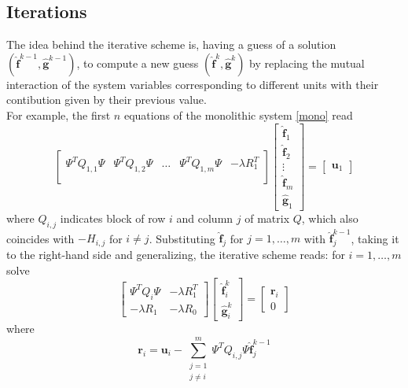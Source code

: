 \subsection{Iterations}
The idea behind the iterative scheme is, having a guess of a solution $(\hat{\mathbf{f}}^{k-1},\hat{\mathbf{g}}^{k-1})$, to compute a new guess $(\hat{\mathbf{f}}^k,\hat{\mathbf{g}}^k)$ by replacing the mutual interaction of the system variables corresponding to different units with their contibution given by their previous value.\\
For example, the first $n$ equations of the monolithic system \ref{mono} read
\begin{equation}
    \begin{bmatrix}
        \Psi^TQ_{1,1}\Psi & \Psi^TQ_{1,2}\Psi &\dots &\Psi^TQ_{1,m}\Psi & -\lambda R_1^T\\
    \end{bmatrix}
    \begin{bmatrix}
        \hat{\mathbf{f}}_1\\
        \hat{\mathbf{f}}_2\\
        \vdots\\
        \hat{\mathbf{f}}_m\\
        \hat{\mathbf{g}}_1    
    \end{bmatrix}
    =
    \begin{bmatrix}
        \mathbf{u}_1
    \end{bmatrix}
\end{equation}
where $Q_{i,j}$ indicates block of row $i$ and column $j$ of matrix $Q$, which also coincides with $-H_{i,j}$ for $i \neq j$.
Substituting $\hat{\mathbf{f}}_j$ for $j=1,\dots,m$ with $\hat{\mathbf{f}}_j^{k-1}$, taking it to the right-hand side and generalizing, the iterative scheme reads: for $i = 1, \dots, m$ solve
\begin{equation}
    \begin{bmatrix}
        \Psi^TQ_i\Psi & -\lambda R_1^T\\
        -\lambda R_1  & -\lambda R_0
    \end{bmatrix}
    \begin{bmatrix}
        \hat{\mathbf{f}}_i^k\\
        \hat{\mathbf{g}}_i^k
    \end{bmatrix}
    =
    \begin{bmatrix}
        \mathbf{r}_i\\
        0
    \end{bmatrix}
\end{equation}
where
\begin{equation}
     \mathbf{r}_i =\mathbf{u}_i -\sum_{\substack{j=1\\ j\neq i}}^m \Psi^TQ_{i,j} \Psi \hat{\mathbf{f}}_j^{k-1}
\end{equation}

